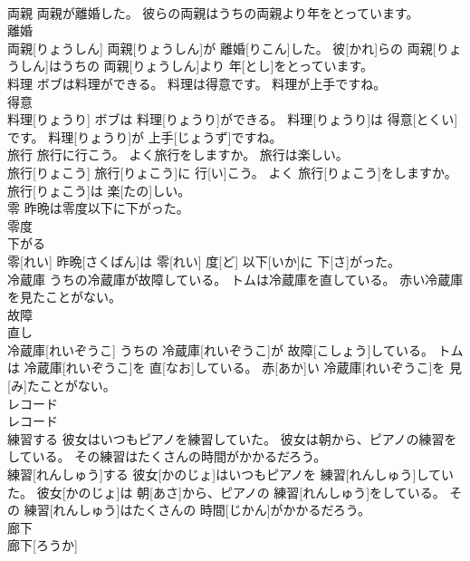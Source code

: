 \documentclass[8pt]{extreport}
\begin{document}
\begin{CJK}{UTF8}{min}
\\	両親 両親が離婚した。 彼らの両親はうちの両親より年をとっています。	
\\	離婚 
\\	両親[りょうしん] 両親[りょうしん]が 離婚[りこん]した。 彼[かれ]らの 両親[りょうしん]はうちの 両親[りょうしん]より 年[とし]をとっています。
\\	料理 ボブは料理ができる。 料理は得意です。 料理が上手ですね。	
\\	得意 
\\	料理[りょうり] ボブは 料理[りょうり]ができる。 料理[りょうり]は 得意[とくい]です。 料理[りょうり]が 上手[じょうず]ですね。
\\	旅行 旅行に行こう。 よく旅行をしますか。 旅行は楽しい。	
\\	旅行[りょこう] 旅行[りょこう]に 行[い]こう。 よく 旅行[りょこう]をしますか。 旅行[りょこう]は 楽[たの]しい。
\\	零 昨晩は零度以下に下がった。	
\\	零度 
\\	下がる
\\	零[れい] 昨晩[さくばん]は 零[れい] 度[ど] 以下[いか]に 下[さ]がった。
\\	冷蔵庫 うちの冷蔵庫が故障している。 トムは冷蔵庫を直している。 赤い冷蔵庫を見たことがない。	
\\	故障 
\\	直し 
\\	冷蔵庫[れいぞうこ] うちの 冷蔵庫[れいぞうこ]が 故障[こしょう]している。 トムは 冷蔵庫[れいぞうこ]を 直[なお]している。 赤[あか]い 冷蔵庫[れいぞうこ]を 見[み]たことがない。
\\	レコード	
\\	レコード
\\	練習する 彼女はいつもピアノを練習していた。 彼女は朝から、ピアノの練習をしている。 その練習はたくさんの時間がかかるだろう。	
\\	練習[れんしゅう]する 彼女[かのじょ]はいつもピアノを 練習[れんしゅう]していた。 彼女[かのじょ]は 朝[あさ]から、ピアノの 練習[れんしゅう]をしている。 その 練習[れんしゅう]はたくさんの 時間[じかん]がかかるだろう。
\\	廊下	
\\	廊下[ろうか]
\end{CJK}
\end{document}
